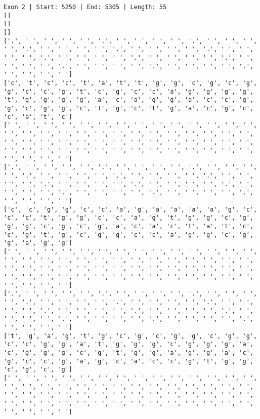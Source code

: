 \documentclass{article}
\begin{document}
\begin{Verbatim}
Exon 2 | Start: 5250 | End: 5305 | Length: 55
[]
[]
[]
['.', ' ', ' ', ' ', ' ', '.', ' ', ' ', ' ', ' ', '.', ' ', ' ', ' ', ' ', '.', ' ', ' ', ' ', ' ', '.', ' ', ' ', ' ', ' ', '.', ' ', ' ', ' ', ' ', '.', ' ', ' ', ' ', ' ', '.', ' ', ' ', ' ', ' ', '.', ' ', ' ', ' ', ' ', '.', ' ', ' ', ' ', ' ', '.', ' ', ' ', ' ', ' ', '.', ' ', ' ', ' ', ' ']
['c', 't', 'c', 'c', 't', 'a', 't', 't', 'g', 'g', 'c', 'g', 'c', 'g', 'g', 'c', 'c', 'g', 't', 'c', 'g', 'c', 'c', 'a', 'g', 'g', 'g', 'g', 't', 'g', 'g', 'g', 'g', 'a', 'c', 'a', 'g', 'g', 'a', 'c', 'c', 'g', 'g', 'c', 'g', 'g', 'c', 't', 'g', 'c', 't', 'g', 'a', 'c', 'g', 'c', 'c', 'a', 't', 'c']
[' ', ' ', ' ', ' ', ' ', ' ', ' ', ' ', ' ', ' ', ' ', ' ', ' ', ' ', ' ', ' ', ' ', ' ', ' ', ' ', ' ', ' ', ' ', ' ', ' ', ' ', ' ', ' ', ' ', ' ', ' ', ' ', ' ', ' ', ' ', ' ', ' ', ' ', ' ', ' ', ' ', ' ', ' ', ' ', ' ', ' ', ' ', ' ', ' ', ' ', ' ', ' ', ' ', ' ', ' ', ' ', ' ', ' ', ' ', ' ']
['.', ' ', ' ', ' ', ' ', '.', ' ', ' ', ' ', ' ', '.', ' ', ' ', ' ', ' ', '.', ' ', ' ', ' ', ' ', '.', ' ', ' ', ' ', ' ', '.', ' ', ' ', ' ', ' ', '.', ' ', ' ', ' ', ' ', '.', ' ', ' ', ' ', ' ', '.', ' ', ' ', ' ', ' ', '.', ' ', ' ', ' ', ' ', '.', ' ', ' ', ' ', ' ', '.', ' ', ' ', ' ', ' ']
['c', 'c', 'g', 'g', 'c', 'c', 'a', 'g', 'a', 'a', 'a', 'a', 'g', 'c', 'c', 'c', 't', 'g', 'g', 'c', 'c', 'a', 'g', 't', 'g', 'g', 'c', 'g', 'g', 'g', 'c', 'g', 'c', 'g', 'a', 'c', 'a', 'c', 't', 'a', 't', 'c', 'c', 'g', 't', 'g', 'c', 'g', 'g', 'c', 'c', 'a', 'g', 'g', 'c', 'g', 'g', 'a', 'g', 'g']
[' ', ' ', ' ', ' ', ' ', ' ', ' ', ' ', ' ', ' ', ' ', ' ', ' ', ' ', ' ', ' ', ' ', ' ', ' ', ' ', ' ', ' ', ' ', ' ', ' ', ' ', ' ', ' ', ' ', ' ', ' ', ' ', ' ', ' ', ' ', ' ', ' ', ' ', ' ', ' ', ' ', ' ', ' ', ' ', ' ', ' ', ' ', ' ', ' ', ' ', ' ', ' ', ' ', ' ', ' ', ' ', ' ', ' ', ' ', ' ']
['.', ' ', ' ', ' ', ' ', '.', ' ', ' ', ' ', ' ', '.', ' ', ' ', ' ', ' ', '.', ' ', ' ', ' ', ' ', '.', ' ', ' ', ' ', ' ', '.', ' ', ' ', ' ', ' ', '.', ' ', ' ', ' ', ' ', '.', ' ', ' ', ' ', ' ', '.', ' ', ' ', ' ', ' ', '.', ' ', ' ', ' ', ' ', '.', ' ', ' ', ' ', ' ', '.', ' ', ' ', ' ', ' ']
['t', 'g', 'a', 'g', 't', 'g', 'c', 'g', 'c', 'g', 'g', 'c', 'g', 'g', 'c', 'c', 'g', 'g', 'a', 't', 'g', 'g', 'g', 'c', 'g', 'g', 'g', 'a', 'c', 'g', 'g', 'g', 'c', 'g', 't', 'g', 'g', 'a', 'g', 'g', 'a', 'c', 'g', 'c', 'c', 'g', 'a', 'g', 'c', 'a', 'c', 'c', 'g', 't', 'g', 'g', 'c', 'g', 'c', 'g']
[' ', ' ', ' ', ' ', ' ', ' ', ' ', ' ', ' ', ' ', ' ', ' ', ' ', ' ', ' ', ' ', ' ', ' ', ' ', ' ', ' ', ' ', ' ', ' ', ' ', ' ', ' ', ' ', ' ', ' ', ' ', ' ', ' ', ' ', ' ', ' ', ' ', ' ', ' ', ' ', ' ', ' ', ' ', ' ', ' ', ' ', ' ', ' ', ' ', ' ', ' ', ' ', ' ', ' ', ' ', ' ', ' ', ' ', ' ', ' ']

\end{Verbatim}
\end{document}
